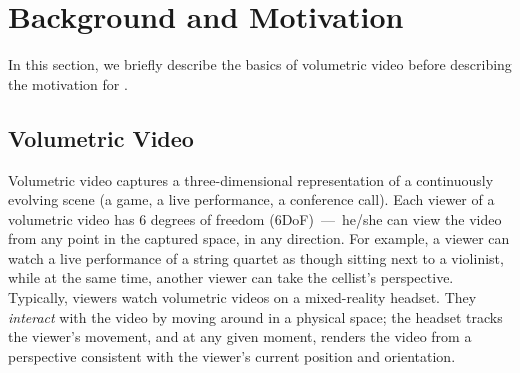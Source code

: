 \section{Background and Motivation}
\label{s:background}

In this section, we briefly describe the basics of volumetric video before describing the motivation for \sysname.

\subsection{Volumetric Video}

Volumetric video captures a three-dimensional representation of a continuously evolving scene (\eg a game, a live performance, a conference call).
%
Each viewer of a volumetric video has 6 degrees of freedom (6DoF)~---~he/she can view the video from any point in the captured space, in any direction.
%
For example, a viewer can watch a live performance of a string quartet as though sitting next to a violinist, while at the same time, another viewer can take the cellist's perspective.
%
Typically, viewers watch volumetric videos on a mixed-reality headset.
%
They \emph{interact} with the video by moving around in a physical space; the headset tracks the viewer's movement, and at any given moment, renders the video from a perspective consistent with the viewer's current position and orientation.
%
%
